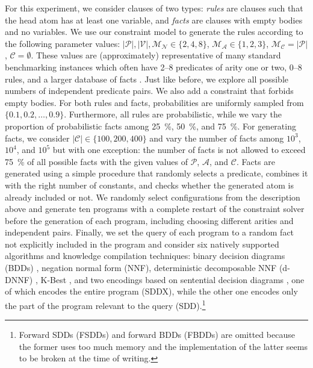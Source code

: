 \documentclass[runningheads]{llncs}
\newcommand{\predicates}{\mathcal{P}}
\newcommand{\variables}{\mathcal{V}}
\newcommand{\constants}{\mathcal{C}}
\newcommand{\arities}{\mathcal{A}}
\newcommand{\maxArity}{\mathcal{M}_{\mathcal{A}}}
\newcommand{\maxNumNodes}{\mathcal{M}_{\mathcal{N}}}
\newcommand{\maxNumClauses}{\mathcal{M}_{\mathcal{C}}}
\begin{document}
For this experiment, we consider clauses of two types: \emph{rules} are clauses
such that the head atom has at least one variable, and \emph{facts} are clauses
with empty bodies and no variables. We use our constraint model to generate the
rules according to the following parameter values: $|\predicates{}|,
|\variables{}|, \maxNumNodes{} \in \{ 2, 4, 8 \}$, $\maxArity{} \in \{ 1, 2, 3
\}$, $\maxNumClauses{} = |\predicates{}|$, $\constants{} = \emptyset$. These
values are (approximately) representative of many standard benchmarking
instances which often have 2--8 predicates of arity one or two, 0--8 rules, and
a larger database of facts \cite{DBLP:journals/tplp/FierensBRSGTJR15}. Just like
before, we explore all possible numbers of independent predicate pairs. We also
add a constraint that forbids empty bodies. For both rules and facts,
probabilities are uniformly sampled from $\{ 0.1, 0.2, \dots, 0.9 \}$.
Furthermore, all rules are probabilistic, while we vary the proportion of
probabilistic facts among \SI{25}{\percent}, \SI{50}{\percent}, and
\SI{75}{\percent}. For generating facts, we consider $|\constants{}| \in \{100,
200, 400 \}$ and vary the number of facts among $10^3$, $10^4$, and $10^5$ but
with one exception: the number of facts is not allowed to exceed
\SI{75}{\percent} of all possible facts with the given values of
$\predicates{}$, $\arities{}$, and $\constants{}$. Facts are generated using a
simple procedure that randomly selects a predicate, combines it with the right
number of constants, and checks whether the generated atom is already included
or not. We randomly select configurations from the description above and
generate ten programs with a complete restart of the constraint solver before
the generation of each program, including choosing different arities and
independent pairs. Finally, we set the query of each program to a random fact
not explicitly included in the program and consider six natively supported
algorithms and knowledge compilation techniques: binary decision diagrams (BDDs)
\cite{DBLP:journals/tc/Bryant86}, negation normal form (NNF), deterministic
decomposable NNF (d-DNNF) \cite{DBLP:journals/jair/DarwicheM02}, K-Best
\cite{DBLP:conf/ijcai/RaedtKT07}, and two encodings based on sentential decision
diagrams \cite{DBLP:conf/ijcai/Darwiche11}, one of which encodes the entire
program (SDDX), while the other one encodes only the part of the program
relevant to the query (SDD).\footnote{Forward SDDs (FSDDs) and forward BDDs
  (FBDDs) \cite{DBLP:conf/aaai/TsamouraGK20,DBLP:conf/ijcai/VlasselaerBKMR15}
  are omitted because the former uses too much memory and the implementation of
  the latter seems to be broken at the time of writing.}
\end{document}
